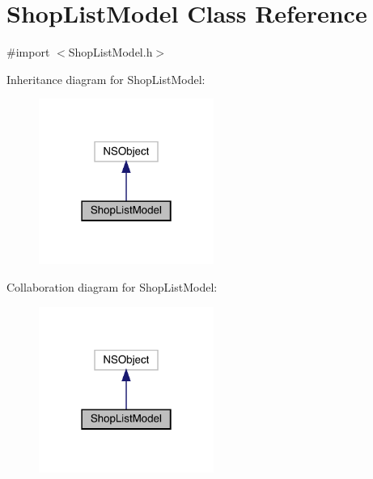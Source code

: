 \hypertarget{interface_shop_list_model}{}\section{Shop\+List\+Model Class Reference}
\label{interface_shop_list_model}


{\ttfamily \#import $<$Shop\+List\+Model.\+h$>$}



Inheritance diagram for Shop\+List\+Model\+:\nopagebreak
\begin{figure}[H]
\begin{center}
\leavevmode
\includegraphics[width=162pt]{interface_shop_list_model__inherit__graph}
\end{center}
\end{figure}


Collaboration diagram for Shop\+List\+Model\+:\nopagebreak
\begin{figure}[H]
\begin{center}
\leavevmode
\includegraphics[width=162pt]{interface_shop_list_model__coll__graph}
\end{center}
\end{figure}
